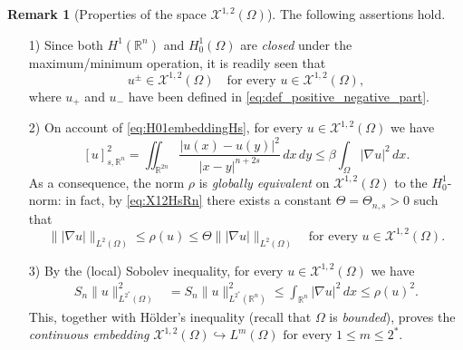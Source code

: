 \documentclass[11pt,a4paper]{amsart}
\def \R {\mathbb{R}}
\theoremstyle{definition}
\newtheorem{remark}[definition]{Remark}
\theoremstyle{plain}
\numberwithin{equation}{section}
\begin{document}
   \begin{remark}[Properties of the space $\mathcal{X}^{1,2}(\Omega)$] \label{rem:spaceX12}
    The following assertions hold.
        \begin{enumerate}
     \item[1)] Since both $H^1(\R^n)$ and $H_0^1(\Omega)$ are \emph{closed} under the
     maximum/minimum o\-pe\-ra\-tion, it is readily seen that
     $$u^{\pm}\in \mathcal{X}^{1,2}(\Omega)\quad\text{for every $u\in\mathcal{X}^{1,2}(\Omega)$},$$
     \noindent where $u_{+}$ and $u_{-}$ have been defined in \eqref{eq:def_positive_negative_part}.
     \item[2)] On account of \eqref{eq:H01embeddingHs}, for every
     $u\in\mathcal{X}^{1,2}(\Omega)$ we have
     \begin{equation} \label{eq:X12HsRn}
    [u]_{s,\R^n}^2 = 
     \iint_{\R^{2n}}\frac{|u(x)-u(y)|^2}{|x-y|^{n+2s}}\,dx\,dy \leq\beta\int_\Omega|\nabla u|^2\,dx.
   \end{equation}
   As a consequence,
   the norm $\rho$ is \emph{glo\-bal\-ly equivalent} on $\mathcal{X}^{1,2}(\Omega)$ to the 
   $H_0^1$-no\-rm: in fact, by \eqref{eq:X12HsRn} there exists a constant $\Theta
   = \Theta_{n,s} > 0$ such that
   \begin{equation} \label{eq:equivalencerhoH01}
    \||\nabla u|\|_{L^2(\Omega)}\leq \rho(u)\leq \Theta\||\nabla u|\|_{L^2(\Omega)}
    \quad\text{for every $u\in\mathcal{X}^{1,2}(\Omega)$}.
   \end{equation}
   
   \item[3)] By the (local) Sobolev inequality, for every $u\in\mathcal{X}^{1,2}(\Omega)$ 
   we have
   \begin{align*}
    S_n\|u\|_{L^{2^\ast}(\Omega)}^2 & = S_n\|u\|_{L^{2^\ast}(\R^n)}^2
    \leq \int_{\R^n}|\nabla u|^2\,dx\leq \rho(u)^2.
   \end{align*}
   This, together with H\"older's inequality
   (recall that $\Omega$ is \emph{bounded}), proves the \emph{continuous embedding}
   $\text{$\mathcal{X}^{1,2}(\Omega)\hookrightarrow L^{m}(\Omega)$ for every $1\leq m\leq 2^\ast$}.$
   \vspace*{0.1cm}
   

\end{enumerate}
\end{remark}
\end{document}
